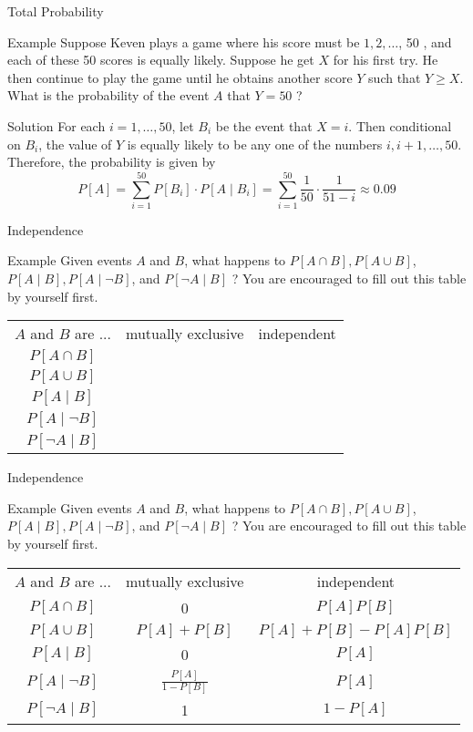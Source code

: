 \documentclass{beamer}
\begin{document}
\begin{frame}{Total Probability}
\begin{block}{Example}
Suppose Keven plays a game where his score must be $1,2, \ldots$, 50 , and each of these 50 scores is equally likely. Suppose he get $X$ for his first try. He then continue to play the game until he obtains another score $Y$ such that $Y \geq X$. What is the probability of the event $A$ that $Y=50$ ?
\end{block}
\pause
\begin{block}{Solution}
For each $i=1, \ldots, 50$, let $B_{i}$ be the event that $X=i$. Then conditional on $B_{i}$, the value of $Y$ is equally likely to be any one of the numbers $i, i+1, \ldots, 50$. Therefore, the probability is given by
$$
P[A]=\sum_{i=1}^{50} P\left[B_{i}\right] \cdot P\left[A \mid B_{i}\right]=\sum_{i=1}^{50} \frac{1}{50} \cdot \frac{1}{51-i} \approx 0.09
$$
\end{block}
\end{frame}

\begin{frame}{Independence}
\begin{block}{Example} Given events $A$ and $B$, what happens to $P[A \cap B], P[A \cup B]$, $P[A \mid B], P[A\mid \neg B]$, and $P[\neg A \mid B]$ ? You are encouraged to fill out this table by yourself first.

\begin{tabular}{c|c|c}
$A$ and $B$ are ... & mutually exclusive & independent \\
$P[A \cap B]$ &  &  \\
$P[A \cup B]$ &  & \\
$P[A \mid B]$ &  &  \\
$P[A \mid \neg B]$ &  & \\
$P[\neg A \mid B]$ &  & 
\end{tabular}
\end{block}
\end{frame}

\begin{frame}{Independence}
\begin{block}{Example} Given events $A$ and $B$, what happens to $P[A \cap B], P[A \cup B]$, $P[A \mid B], P[A\mid \neg B]$, and $P[\neg A \mid B]$ ? You are encouraged to fill out this table by yourself first.

\begin{tabular}{c|c|c}
$A$ and $B$ are ... & mutually exclusive & independent \\
$P[A \cap B]$ & 0 & $P[A] P[B]$ \\
$P[A \cup B]$ & $P[A]+P[B]$ & $P[A]+P[B]-P[A] P[B]$ \\
$P[A \mid B]$ & 0 & $P[A]$ \\
$P[A \mid \neg B]$ & $\frac{P[A]}{1-P[B]}$ & $P[A]$ \\
$P[\neg A \mid B]$ & 1 & $1-P[A]$
\end{tabular}
\end{block}
\end{frame}
\end{document}
